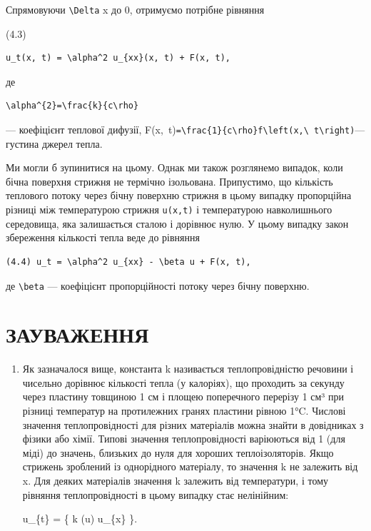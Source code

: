 \documentclass[
  ukrainian,
]{article}
\begin{document}
Спрямовуючи \texttt{\textbackslash{}Delta} x до 0, отримуємо потрібне
рівняння

(4.3)

\begin{verbatim}
u_t(x, t) = \alpha^2 u_{xx}(x, t) + F(x, t),
\end{verbatim}

де

\begin{verbatim}
\alpha^{2}=\frac{k}{c\rho}
\end{verbatim}

--- коефіцієнт теплової дифузії,
F\left(x,~t\right)\texttt{=\textbackslash{}frac\{1\}\{c\textbackslash{}rho\}f\textbackslash{}left(x,\textbackslash{}\ t\textbackslash{}right)}---
густина джерел тепла.

Ми могли б зупинитися на цьому. Однак ми також розглянемо випадок, коли
бічна поверхня стрижня не термічно ізольована. Припустимо, що кількість
теплового потоку через бічну поверхню стрижня в цьому випадку
пропорційна різниці між температурою стрижня \texttt{u(x,t)} і
температурою навколишнього середовища, яка залишається сталою і дорівнює
нулю. У цьому випадку закон збереження кількості тепла веде до рівняння

\begin{verbatim}
(4.4) u_t = \alpha^2 u_{xx} - \beta u + F(x, t),
\end{verbatim}

де \texttt{\textbackslash{}beta} --- коефіцієнт пропорційності потоку
через бічну поверхню.

\section{ЗАУВАЖЕННЯ}\label{ux437ux430ux443ux432ux430ux436ux435ux43dux43dux44f-3}

\begin{enumerate}
\def\labelenumi{\arabic{enumi}.}
\item
  Як зазначалося вище, константа k називається теплопровідністю речовини
  і чисельно дорівнює кількості тепла (у калоріях), що проходить за
  секунду через пластину товщиною 1 см і площею поперечного перерізу 1
  см³ при різниці температур на протилежних гранях пластини рівною 1°C.
  Числові значення теплопровідності для різних матеріалів можна знайти в
  довідниках з фізики або хімії. Типові значення теплопровідності
  варіюються від 1 (для міді) до значень, близьких до нуля для хороших
  теплоізоляторів. Якщо стрижень зроблений із однорідного матеріалу, то
  значення k не залежить від x. Для деяких матеріалів значення k
  залежить від температури, і тому рівняння теплопровідності в цьому
  випадку стає нелінійним:

  u\_\{t\} =   \{ k (u)
  \textbar{} u\_\{x\} \}.
\end{enumerate}
\end{document}
